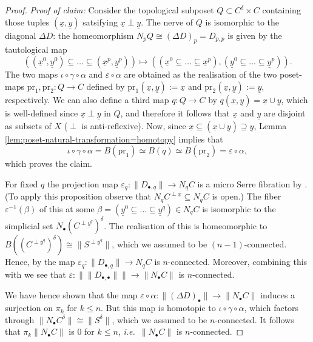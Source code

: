 \documentclass{amsart}
\theoremstyle{plain}
\theoremstyle{definition}
\renewcommand{\ul}[1]{\underline{#1}}
\begin{document}
\begin{proof}
    \textit{Proof of claim:}
    Consider the topological subposet $Q \subset C^\delta \times C$ containing those tuples $(\ul{x}, \ul{y})$ satsifying $\ul{x} \perp \ul{y}$.
    The nerve of $Q$ is isomorphic to the diagonal $\Delta D$:
    the homeomorphism $N_p Q \cong (\Delta D)_p = D_{p,p}$ is given by the tautological map
    \[
        ((\ul{x}^0, \ul{y}^0) \subseteq \dots \subseteq (\ul{x}^p,\ul{y}^p))
        \longmapsto
        ((\ul{x}^0 \subseteq \dots \subseteq \ul{x}^p), (\ul{y}^0 \subseteq \dots \subseteq \ul{y}^p)).
    \]
    The two maps $\iota \circ \gamma \circ \alpha$ and $\varepsilon \circ \alpha$ are obtained as the realisation of the two poset-maps 
    $\mathrm{pr}_1, \mathrm{pr}_2: Q \to C$ defined by $\mathrm{pr}_1(\ul{x}, \ul{y}) := \ul{x}$ and $\mathrm{pr}_2 (\ul{x}, \ul{y}) := \ul{y}$, respectively.
    We can also define a third map $q:Q \to C$ by $q(\ul{x}, \ul{y}) = \ul{x} \cup \ul{y}$, which is well-defined
    since $\ul{x} \perp \ul{y}$ in $Q$, and therefore it follows that $\ul{x}$ and $\ul{y}$ are disjoint as subsets of $X$ ($\perp$ is anti-reflexive).
    Now, since $\ul{x} \subseteq (\ul{x} \cup \ul{y}) \supseteq \ul{y}$, Lemma \ref{lem:poset-natural-transformation=homotopy} implies that
    \[
        \iota \circ \gamma \circ \alpha = B(\mathrm{pr}_1) \simeq B(q) \simeq B(\mathrm{pr}_2) = \varepsilon \circ \alpha, 
    \]
    which proves the claim.
    
    For fixed $q$ the projection map $\varepsilon_q: \|D_{\bullet,q}\| \to N_q C$ is a micro Serre fibration by \cite[Proposition 2.8]{GalatiusRandalWilliams}.
    (To apply this proposition observe that $N_q C^{\perp \ul{x}} \subseteq N_q C$ is open.)
    The fiber $\varepsilon^{-1}(\beta)$ of this at some $\beta = (\ul{y}^0 \subseteq \dots \subseteq \ul{y}^q) \in N_q C$ is isomorphic to the simplicial set $N_\bullet ( C^{\perp \ul{y}^q} )^\delta$.
    The realisation of this is homeomorphic to $B( (C^{\perp \ul{y}^q})^\delta ) \cong \|S^{\perp \ul{y}^q}\|$, which we assumed to be $(n-1)$-connected.
    Hence, by \cite[Proposition 2.6]{GalatiusRandalWilliams} the map $\varepsilon_q: \|D_{\bullet,q}\| \to N_q C$ is $n$-connected.
    Moreover, combining this with \cite[Proposition 2.7]{GalatiusRandalWilliams} we see that $\varepsilon: \|\|D_{\bullet,\bullet}\|\| \to \|N_\bullet C\|$ is $n$-connected.
    
    We have hence shown that the map $\varepsilon \circ \alpha: \|(\Delta D)_\bullet\| \to \|N_\bullet C\|$ induces a surjection on $\pi_k$ for $k \le n$.
    But this map is homotopic to $\iota \circ \gamma \circ \alpha$, 
    which factors through $\|N_\bullet C^\delta\| \cong \|S^\delta\|$, which we assumed to be $n$-connected.
    It follows that $\pi_k \|N_\bullet C\|$ is $0$ for $k \le n$,
    \emph{i.e.}~$\|N_\bullet C\|$ is $n$-connected.
\end{proof}
\end{document}

